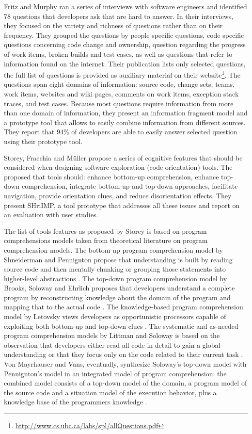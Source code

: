 Fritz and Murphy \cite{Frit10a} ran a series of interviews with software engineers and identified 78 questions that developers ask that are hard to answer. In their interviews, they focused on the variety and richness of questions rather than on their frequency. They grouped the questions by people specific questions, code specific questions concerning code change and ownership, question regarding the progress of work items, broken builds and test cases, as well as questions that refer to information found on the internet. Their publication lists only selected questions, the full list of questions is provided as auxiliary material on their website\footnote{\url{http://www.cs.ubc.ca/labs/spl/allQuestions.pdf}}. The questions span eight domains of information: source code, change sets, teams, work items, websites and wiki pages, comments on work items, exception stack traces, and test cases. Because most questions require information from more than one domain of information, they present an information fragment model and a prototype tool that allows to easily combine information from different sources. They report that 94\% of developers are able to easily answer selected question using their prototype tool.

Storey, Fracchia and M\"uller \cite{Stor99a} propose a series of cognitive features that should be considered when designing software exploration (\ie code orientation) tools. The proposed that tools should: enhance bottom-up comprehension, enhance top-down comprehension, integrate bottom-up and top-down approaches, facilitate navigation, provide orientation clues, and reduce disorientation effects. They present SHriIMP, a tool prototype that addresses all these issues and report on an evaluation with user studies. 

The list of tools features as proposed by Storey \etal is based on program comprehensions models taken from theoretical literature on program comprehension models.
%
The bottom-up program comprehension model by Shneiderman and Pennignton propose that understanding is built by reading source code and then mentally chunking  or grouping those statements into higher-level abstractions \cite{Shne80a,Shne79a,Penn87a}.
%
The top-down program comprehension model by Brooks, Soloway and Ehrlich proposes that developers understand a complete program by reconstructing knowledge about the domain of the program and mapping that to the actual code \cite{Broo83b, Solo84a}. 
% 
The knowledge-based program comprehension model by Letovsky views developers as opportunistic processors capable of exploiting both bottom-up and top-down clues \cite{Leto86a}. 
%
The systematic and as-needed program comprehension models by Littman and Soloway is based on the  observation that developers either read all code in detail to gain a global understanding or that they focus only on the code related to their current task \cite{LittXXx,SoloXXx}.
%
Von Mayrhauser and Vans, eventually, synthesize Soloway's top-down model with Pennignton's model in an integrated model of program comprehension: the combined model consists of a top-down model of the domain, a program model of the source code and a situation model of the execution behavior, plus a knowledge base of the programmers knowledge \cite{MayrXXx}. 


